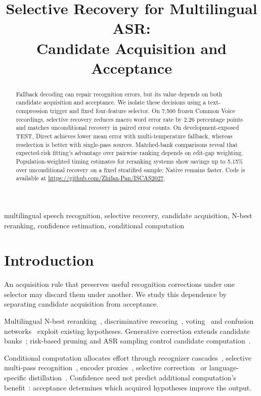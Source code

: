 \documentclass[conference,letterpaper]{IEEEtran}
\title{Selective Recovery for Multilingual ASR:\\Candidate Acquisition and Acceptance}
\begin{document}
\maketitle\raggedbottom
\begin{abstract}
Fallback decoding can repair recognition errors, but its value depends on both candidate acquisition and acceptance. We isolate these decisions using a text-compression trigger and fixed four-feature selector. On 7,500 frozen Common Voice recordings, selective recovery reduces macro word error rate by 2.26 percentage points and matches unconditional recovery in paired error counts. On development-exposed TEST, Direct achieves lower mean error with multi-temperature fallback, whereas reselection is better with single-pass sources. Matched-bank comparisons reveal that expected-risk fitting's advantage over pairwise ranking depends on edit-gap weighting. Population-weighted timing estimates for reranking systems show savings up to 5.15\% over unconditional recovery on a fixed stratified sample; Native remains faster. Code is available at \url{https://github.com/Zhifan-Pan/ISCAS2027}.
\end{abstract}
\begin{IEEEkeywords}
multilingual speech recognition, selective recovery, candidate acquisition, N-best reranking, confidence estimation, conditional computation
\end{IEEEkeywords}

\section{Introduction}
An acquisition rule that preserves useful recognition corrections under one selector may discard them under another. We study this dependence by separating candidate acquisition from acceptance.

Multilingual N-best reranking~\cite{gaur2022,yan2025wild}, discriminative rescoring~\cite{rescorebert,discriminative2023,audioattention2019}, voting~\cite{fiscus1997} and confusion networks~\cite{mangu2000} exploit existing hypotheses. Generative correction extends candidate banks~\cite{kuo2026framework,dutta2022,progres2024,whisperingllama}; risk-based pruning and ASR sampling control candidate computation~\cite{cheng2023pruning,jinnai2025mbrasr}.

Conditional computation allocates effort through recognizer cascades~\cite{xue2025sima}, selective multi-pass recognition~\cite{aleksic2025}, encoder proxies~\cite{fathullah2024proxies}, selective correction~\cite{lim2025hybrid} or language-specific distillation~\cite{ferraz2024distil}. Confidence need not predict additional computation's benefit~\cite{jitkrittum2023cascade}: acceptance determines which acquired hypotheses improve the output.
\end{document}

